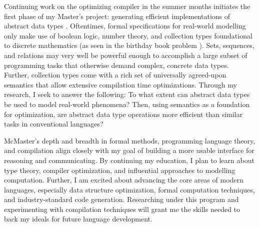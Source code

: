 \documentclass[11pt]{article}
\begin{document}
Continuing work on the optimizing compiler in the summer months initiates the first phase of my Master's project: generating efficient implementations of abstract data types \cite{hunt2025generating}. Oftentimes, formal specifications for real-world modelling only make use of boolean logic, number theory, and collection types foundational to discrete mathematics (as seen in the birthday book problem \cite{spivey1989birthday}). Sets, sequences, and relations may very well be powerful enough to accomplish a large subset of programming tasks that otherwise demand complex, concrete data types. Further, collection types come with a rich set of universally agreed-upon semantics \cite{griesAndSchneider} that allow extensive compilation time optimizations. Through my research, I seek to answer the following: To what extent can abstract data types be used to model real-world phenomena? Then, using semantics as a foundation for optimization, are abstract data type operations more efficient than similar tasks in conventional languages?

McMaster's depth and breadth in formal methods, programming language theory, and compilation align closely with my goal of building a more usable interface for reasoning and communicating. By continuing my education, I plan to learn about type theory, compiler optimization, and influential approaches to modelling computation. Further, I am excited about advancing the core areas of modern languages, especially data structure optimization, formal computation techniques, and industry-standard code generation. Researching under this program and experimenting with compilation techniques will grant me the skills needed to back my ideals for future language development.

\pagebreak
\nocite{*} %
\printbibliography %
\end{document}
